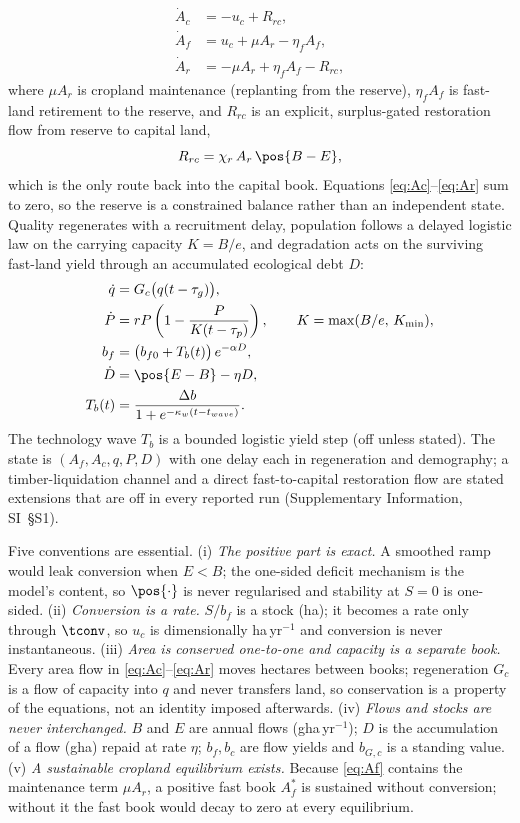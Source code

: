 \begin{align}
\dot A_c&=-u_c+R_{rc},\label{eq:Ac}\\
\dot A_f&=u_c+\mu A_r-\eta_f A_f,\label{eq:Af}\\
\dot A_r&=-\mu A_r+\eta_f A_f-R_{rc},\label{eq:Ar}
\end{align}
where $\mu A_r$ is cropland maintenance (replanting from the reserve), $\eta_f A_f$ is fast-land retirement to the reserve, and $R_{rc}$ is an explicit, surplus-gated restoration flow from reserve to capital land,
\begin{equation}\label{eq:Rrc}
R_{rc}=\chi_r\,A_r\,\pos{B-E},
\end{equation}
which is the only route back into the capital book. Equations \eqref{eq:Ac}--\eqref{eq:Ar} sum to zero, so the reserve is a constrained balance rather than an independent state. Quality regenerates with a recruitment delay, population follows a delayed logistic law \citep{Pearl1925,Hutchinson1948} on the carrying capacity $K=B/e$, and degradation acts on the surviving fast-land yield through an accumulated ecological debt $D$:
\begin{align}
\dot q&=G_c\big(q(t-\tau_g)\big),\label{eq:q}\\
\dot P&=rP\left(1-\frac{P}{K(t-\tau_p)}\right),\qquad K=\max(B/e,\,K_{\min}),\label{eq:P}\\
b_f&=\big(b_{f0}+T_b(t)\big)\,e^{-\alpha D},\label{eq:bf}\\
\dot D&=\pos{E-B}-\eta D,\label{eq:D}\\
T_b(t)&=\frac{\Delta b}{1+e^{-\kappa_w(t-t_{wave})}}.\label{eq:Tb}
\end{align}
The technology wave $T_b$ is a bounded logistic yield step (off unless stated). The state is $(A_f,A_c,q,P,D)$ with one delay each in regeneration and demography; a timber-liquidation channel and a direct fast-to-capital restoration flow are stated extensions that are off in every reported run (Supplementary Information, SI~\S S1).

Five conventions are essential. (i) \emph{The positive part is exact.} A smoothed ramp would leak conversion when $E<B$; the one-sided deficit mechanism is the model's content, so $\pos{\cdot}$ is never regularised and stability at $S=0$ is one-sided. (ii) \emph{Conversion is a rate.} $S/b_f$ is a stock (ha); it becomes a rate only through $\tconv$, so $u_c$ is dimensionally ha\,yr$^{-1}$ and conversion is never instantaneous. (iii) \emph{Area is conserved one-to-one and capacity is a separate book.} Every area flow in \eqref{eq:Ac}--\eqref{eq:Ar} moves hectares between books; regeneration $G_c$ is a flow of capacity into $q$ and never transfers land, so conservation is a property of the equations, not an identity imposed afterwards. (iv) \emph{Flows and stocks are never interchanged.} $B$ and $E$ are annual flows (gha\,yr$^{-1}$); $D$ is the accumulation of a flow (gha) repaid at rate $\eta$; $b_f,b_c$ are flow yields and $b_{G,c}$ is a standing value. (v) \emph{A sustainable cropland equilibrium exists.} Because \eqref{eq:Af} contains the maintenance term $\mu A_r$, a positive fast book $A_f^*$ is sustained without conversion; without it the fast book would decay to zero at every equilibrium.

